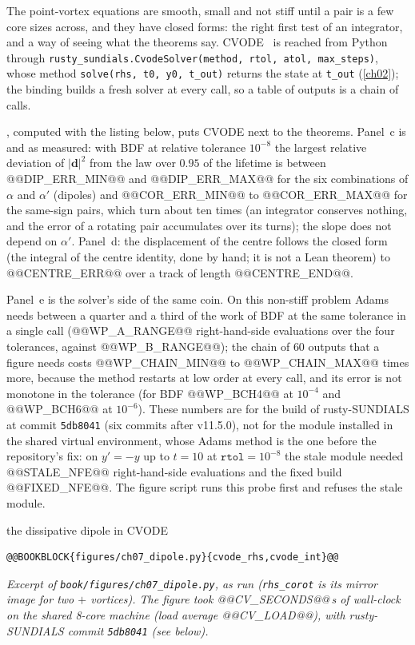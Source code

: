 The point-vortex equations are smooth, small and not stiff until a pair is a few core sizes across, and they have closed forms: the right first test of an integrator, and a way of seeing what the theorems say. CVODE~\cite{Hindmarsh2005} is reached from
Python through \texttt{rusty\_sundials.CvodeSolver(method, rtol, atol, max\_steps)}, whose method \texttt{solve(rhs, t0, y0, t\_out)} returns the state at \texttt{t\_out} (\cref{ch02}); the binding builds a fresh solver at every call, so a table of outputs is a chain of calls.

, computed with the listing below, puts CVODE next to the theorems. Panel~c is  and  as measured: with BDF at relative tolerance $10^{-8}$ the largest relative
deviation of $|\mathbf d|^2$ from the law over $0.95$ of the lifetime is between @@DIP_ERR_MIN@@ and @@DIP_ERR_MAX@@ for the six combinations of $\alpha$ and $\alpha'$ (dipoles) and @@COR_ERR_MIN@@ to @@COR_ERR_MAX@@ for the same-sign pairs, which turn about ten times (an integrator conserves nothing, and the error of a rotating pair accumulates over its turns); the slope does not depend on $\alpha'$.
Panel~d: the displacement of the centre follows the closed form (the integral of the centre identity, done by hand; it is not a Lean theorem) to @@CENTRE_ERR@@ over a track of length @@CENTRE_END@@.

Panel~e is the solver's side of the same coin. On this non-stiff problem Adams needs between a quarter and a third of the work of BDF at the same tolerance in a single call (@@WP_A_RANGE@@ right-hand-side evaluations over the four tolerances, against @@WP_B_RANGE@@); the chain of $60$ outputs that a figure needs costs @@WP_CHAIN_MIN@@ to @@WP_CHAIN_MAX@@ times more, because the method restarts at low order at every call, and its error is not monotone in the tolerance (for BDF @@WP_BCH4@@ at $10^{-4}$ and @@WP_BCH6@@ at $10^{-6}$).
These numbers are for the build of rusty-SUNDIALS at commit \texttt{5db8041} (six commits after v11.5.0), not for the module installed in the shared virtual environment, whose Adams method is the one before the repository's fix: on $y'=-y$ up to $t=10$ at $\texttt{rtol}=10^{-8}$ the stale module needed @@STALE_NFE@@ right-hand-side evaluations and the fixed build @@FIXED_NFE@@. The figure script runs this probe first and refuses the stale module.

\begin{rustbox}[unbreakable]{the dissipative dipole in CVODE}
\begin{lstlisting}[style=py,basicstyle=\ttfamily\footnotesize]
@@BOOKBLOCK{figures/ch07_dipole.py}{cvode_rhs,cvode_int}@@
\end{lstlisting}
\nopagebreak[4]\smallskip\noindent\textit{Excerpt of \texttt{book/figures/ch07\_dipole.py}, as run (\texttt{rhs\_corot} is its mirror image for two $+$ vortices). The figure took @@CV_SECONDS@@\,s of wall-clock on the shared 8-core machine (load average @@CV_LOAD@@), with rusty-SUNDIALS commit \texttt{5db8041} (see below).}
\end{rustbox}


